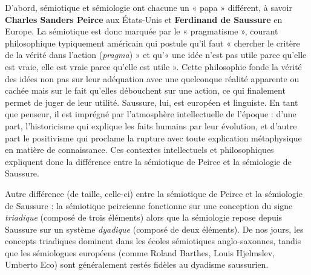 D’abord, sémiotique et sémiologie ont chacune un « papa » différent, à savoir \textbf{Charles Sanders Peirce} aux États-Unis et \textbf{Ferdinand de Saussure} en Europe. La sémiotique est donc marquée par le « pragmatisme », courant philosophique typiquement américain qui postule qu’il faut « chercher le critère de la vérité dans l’action (\textit{pragma}) » et qu’« une idée n’est pas utile parce qu’elle est vraie, elle est vraie parce qu’elle est utile ». Cette philosophie fonde la vérité des idées non pas sur leur adéquation avec une quelconque réalité apparente ou cachée mais sur le fait qu’elles débouchent sur une action, ce qui finalement permet de juger de leur utilité. Saussure, lui, est européen et linguiste. En tant que penseur, il est imprégné par l’atmosphère intellectuelle de l’époque : d’une part, l’historicisme qui explique les faits humains par leur évolution, et d’autre part le positivisme qui proclame la rupture avec toute explication métaphysique en matière de connaissance. Ces contextes intellectuels et philosophiques expliquent donc la différence entre la sémiotique de Peirce et la sémiologie de Saussure.

Autre différence (de taille, celle-ci) entre la sémiotique de Peirce et la sémiologie de Saussure : la sémiotique peircienne fonctionne sur une conception du signe \textit{triadique} (composé de trois éléments) alors que la sémiologie repose depuis Saussure sur un système \textit{dyadique} (composé de deux éléments). De nos jours, les concepts triadiques dominent dans les écoles sémiotiques anglo-saxonnes, tandis que les sémiologues européens (comme Roland Barthes, Louis Hjelmslev, Umberto Eco) sont généralement restés fidèles au dyadisme saussurien.

